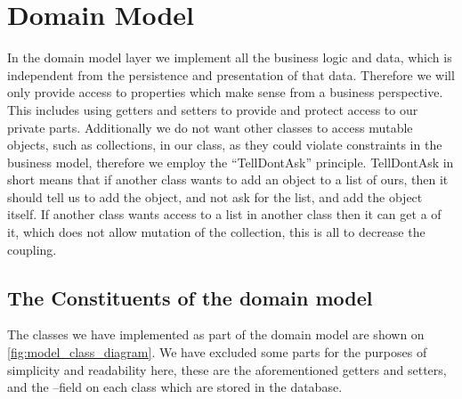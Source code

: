\chapter{Domain Model}\label{subsec:model}

In the domain model layer we implement all the business logic and data, which is independent from the persistence and presentation of that data. 
Therefore we will only provide access to properties which make sense from a business perspective.
This includes using getters and setters to provide and protect access to our private parts. %
Additionally we do not want other classes to access mutable objects, such as collections, in our class, as they could violate constraints in the business model, therefore we employ the ``TellDontAsk'' principle\cite{Fowler_TellDontAsk}.
TellDontAsk in short means that if another class wants to add an object to a list of ours, then it should tell us to add the object, and not ask for the list, and add the object itself. 
If another class wants access to a list in another class then it can get a  of it, which does not allow mutation of the collection, this is all to decrease the coupling.

\section{The Constituents of the domain model}
The classes we have implemented as part of the domain model are shown on \cref{fig:model_class_diagram}.
We have excluded some parts for the purposes of simplicity and readability here, these are the aforementioned getters and setters, and the --field on each class which are stored in the database. 

